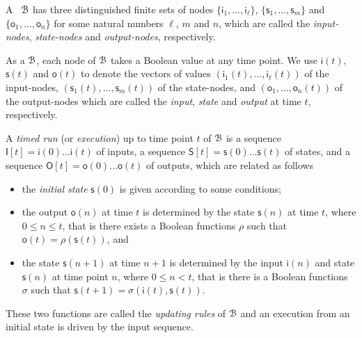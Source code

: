 A \BCN\  ${\mathcal{B}}$ has three distinguished finite sets of nodes $\{\mathsf{i}_1,\ldots, \mathsf{i}_\ell\}$, $\{\mathsf{s}_1,\ldots,\mathsf{s}_m\}$ and $\{\mathsf{o}_1,\ldots, \mathsf{o}_n\}$ for some natural numbers $\ell$, $m$ and $n$, which are called the {\em input-nodes}, {\em state-nodes}  and {\em output-nodes}, respectively. 

As a {\BCN} ${\mathcal{B}}$, each node of   ${\mathcal{B}}$   takes a Boolean value at any time point. We use $\mathsf{i}(t)$, $\mathsf{s}(t)$ and $\mathsf{o}(t)$  to denote the vectors of values $(\mathsf{i}_1(t),\ldots,\mathsf{i}_\ell(t))$ of the input-nodes,  $(\mathsf{s}_1(t),\ldots,\mathsf{s}_m(t))$ of the state-nodes, and $(\mathsf{o}_1,\ldots,\mathsf{o}_n(t))$ of the output-nodes  which are called the {\em input}, {\em state} and {\em output} at time $t$, respectively.

A {\em timed run}  (or {\em execution}) up to time point $t$ of  ${\mathcal{B}}$ is a sequence $\mathsf{I}[t] = \mathsf{i}(0)\ldots \mathsf{i}(t)$ of inputs, a sequence $\mathsf{S}[t] = \mathsf{s}(0)\ldots \mathsf{s}(t)$ of states, and a sequence $\mathsf{O}[t] = \mathsf{o}(0)\ldots \mathsf{o}(t)$  of outputs, which are related as follows

\begin{itemize}
\item the {\em initial state} $\mathsf{s}(0)$ is given according to some conditions;
	\item the output $\mathsf{o}(n)$ at time $t$ is determined by the state $\mathsf{s}(n)$ at time $t$, where $0\le n\le t$, that is there exists a Boolean functions $\rho$ such that $\mathsf{o}(t)=\rho(\mathsf{s}(t))$, and  
	\item the state $\mathsf{s}(n+1)$ at time $n+1$ is determined by the input $\mathsf{i}(n)$ and state $\mathsf{s}(n)$ at time point $n$, where $0\le n< t$, that is there is a Boolean functions $\sigma$ such that $\mathsf{s}(t+1)=\sigma(\mathsf{i}(t),\mathsf{s}(t))$.
\end{itemize}
 These two functions are called the {\em updating rules} of ${\mathcal{B}}$ and an execution from an initial state is driven by the input sequence.
 
